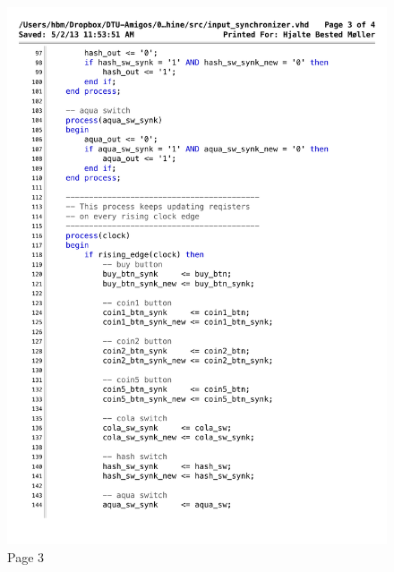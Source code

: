 \begin{figure}[!h]
\centering
\includegraphics[scale=0.6]{figs/input_synchronizer_3.pdf}
\caption{Page 3}
\label{vhd:inpsync3}
\end{figure}

